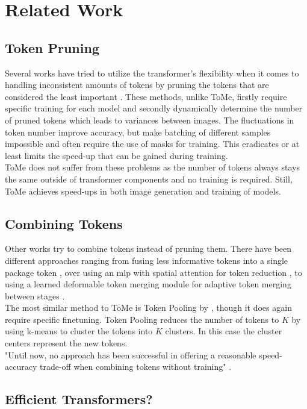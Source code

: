 \section{Related Work}


\subsection*{Token Pruning}
Several works have tried to utilize the transformer's flexibility when it comes to handling inconsistent amounts of tokens by pruning the tokens that are considered the least important \cite{meng2022adavit,yin2022vit}. These methods, unlike ToMe, firstly require specific training for each model and secondly dynamically determine the number of pruned tokens which leads to variances between images. The fluctuations in token number improve accuracy, but make batching of different samples impossible and often require the use of masks for training. This eradicates or at least limits the speed-up that can be gained during training.\\
ToMe does not suffer from these problems as the number of tokens always stays the same outside of transformer components and no training is required. Still, ToMe achieves speed-ups in both image generation and training of models.



\subsection*{Combining Tokens}
Other works try to combine tokens instead of pruning them.
There have been different approaches ranging from fusing less informative tokens into a single package token \cite{kong2021spvit, liang2022not}, over using an mlp with spatial attention for token reduction \cite{ryoo2021tokenlearner}, to using a learned deformable token merging module for adaptive token merging between stages \cite{pan2022less}.\\
The most similar method to ToMe is Token Pooling by \cite{marin2021token}, though it does again require specific finetuning. Token Pooling reduces the number of tokens to \(K\) by using k-means to cluster the tokens into \(K\) clusters. In this case the cluster centers represent the new tokens.\\
"Until now, no approach has been successful in offering a reasonable speed-accuracy trade-off when combining tokens without training" \cite{bolya2023tome}.



\subsection*{Efficient Transformers?}